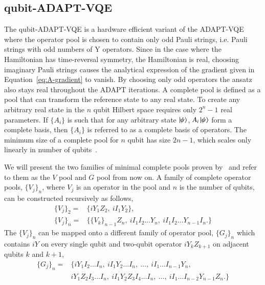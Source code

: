 \subsection{qubit-ADAPT-VQE}
\label{sub:qubit_adapt_vqe}
The qubit-ADAPT-VQE is a hardware efficient variant of the ADAPT-VQE where the operator pool is chosen to contain only odd Pauli strings, i.e. Pauli strings with odd numbers of Y operators. Since in the case where the Hamiltonian has time-reversal symmetry, the Hamiltonian is real, choosing imaginary Pauli strings causes the analytical expression of the gradient given in Equation~\eqref{eq:A-gradient} to vanish. By choosing only odd operators the ansatz also stays real throughout the ADAPT iterations. A complete pool is defined as a pool that can transform the reference state to any real state. To create any arbitrary real state in the $ n $ qubit Hilbert space requires only $ 2^n -1 $ real parameters.
If $ \{ A_i \}  $ is such that for any arbitrary state $ \ket{\psi}$,  $A_i \ket{\psi}$ form a complete basis, then $ \{ A_i \}  $ is referred to as a complete basis of operators. The minimum size of a complete pool for $ n $ qubit has size $ 2n-1 $, which scales only linearly in number of qubits~\cite{tang2021}. 

We will present the two families of minimal complete pools proven by~\cite{tang2021} and refer to them as the $ V $ pool and $ G $ pool from now on. A family of complete operator pools, $ \{ V_j \}_n $,  where $ V_j $ is an operator in the pool and $ n $ is the number of qubits, can be constructed recursively as follows,
\begin{align}
\label{eq:vpool}
\{ V_j \}_2 = &\{ iY_1Z_2, \ iI_1Y_2 \}, \\
\{ V_j \}_n = &\{\{V_k\}_{n-1}Z_n, \ iI_1I_2 \ldots Y_n, \ iI_1I_2 \ldots Y_{n-1} I_n. \}
\end{align}
	The $ \{ V_j \}_n $ can be mapped onto a different family of operator pool, $ \{ G_j \}_n  $ which contains $ iY $ on every single qubit and two-qubit operator $ iY_kZ_{k+1} $ on adjacent qubits $ k $ and $ k+1 $,  
\begin{align}
\label{eq:gpool}
\{ G_j \}_n = &\{ iY_1I_2 \ldots I_n, \ iI_1Y_2 \ldots I_n, \ \ldots, \ iI_1 \ldots I_{n-1}Y_n, \\
              & iY_1Z_2I_3 \ldots I_n, \ iI_1Y_2Z_3I_4 \ldots I_n, \ \ldots, \ iI_1 \ldots I_{n-2}Y_{n-1}Z_{n}. \}
\end{align}


